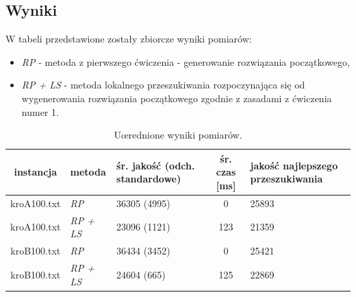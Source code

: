 \documentclass{article}
\begin{document}
\subsection{Wyniki}
W tabeli przedstawione zostały zbiorcze wyniki pomiarów:
\begin{itemize}
	\item \emph{RP} - metoda z pierwszego ćwiczenia - generowanie rozwiązania początkowego,
	\item \emph{RP + LS} - metoda lokalnego przeszukiwania rozpoczynająca się od wygenerowania rozwiązania początkowego zgodnie z zasadami z ćwiczenia numer 1. 
\end{itemize}
	

\begin{table}[h!]
\begin{center}
\centering
  \begin{tabular}{| c | D | S | c | S | }
\hline
	instancja & metoda & śr. jakość (odch. standardowe) & śr. czas [ms] & jakość najlepszego przeszukiwania \\ \hline
    kroA100.txt & \emph{RP} & 36305 (4995) & 0 & 25893 \\
    kroA100.txt & \emph{RP + LS} & 23096 (1121) & 123 & 21359 \\
\hline
    kroB100.txt & \emph{RP} & 36434 (3452) & 0 & 25421 \\
    kroB100.txt & \emph{RP + LS} & 24604 (665) & 125 & 22869 \\
\hline
  \end{tabular}
\end{center}
\caption{Uœrednione wyniki pomiarów.} \label{tab:wynikils}
\end{table}
\end{document}

